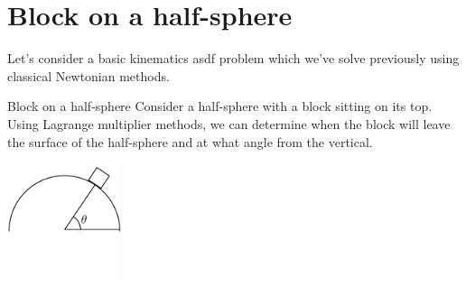 \documentclass[11pt]{article}
\begin{document}
\titleblock


\section{Block on a half-sphere}
Let's consider a basic kinematics asdf problem which we've solve previously using classical Newtonian methods.

\begin{example}{Block on a half-sphere}
Consider a half-sphere with a block sitting on its top. Using Lagrange multiplier methods, we can determine when the block will leave the surface of the half-sphere and at what angle from the vertical.

\begin{center}\includegraphics[width=0.25\textwidth]{fig1.pdf}\end{center}


\end{example}
\end{document}
